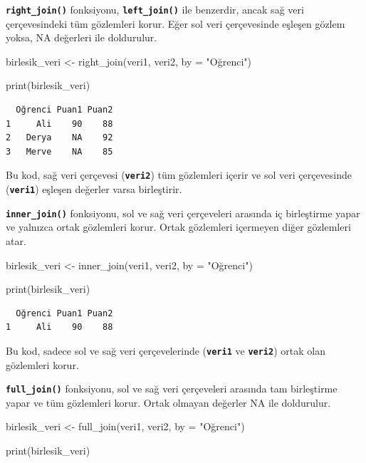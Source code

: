 \documentclass[
  letterpaper,
  DIV=11,
  numbers=noendperiod]{scrreprt}
\newenvironment{Shaded}{\begin{snugshade}}{\end{snugshade}}
\newcommand{\AttributeTok}[1]{\textcolor[rgb]{0.40,0.45,0.13}{#1}}
\newcommand{\FunctionTok}[1]{\textcolor[rgb]{0.28,0.35,0.67}{#1}}
\newcommand{\NormalTok}[1]{\textcolor[rgb]{0.00,0.23,0.31}{#1}}
\newcommand{\OtherTok}[1]{\textcolor[rgb]{0.00,0.23,0.31}{#1}}
\newcommand{\StringTok}[1]{\textcolor[rgb]{0.13,0.47,0.30}{#1}}
\begin{document}
\textbf{\texttt{right\_join()}} fonksiyonu,
\textbf{\texttt{left\_join()}} ile benzerdir, ancak sağ veri
çerçevesindeki tüm gözlemleri korur. Eğer sol veri çerçevesinde eşleşen
gözlem yoksa, NA değerleri ile doldurulur.

\begin{Shaded}
\begin{Highlighting}[]
\NormalTok{birlesik\_veri }\OtherTok{\textless{}{-}} \FunctionTok{right\_join}\NormalTok{(veri1, veri2, }\AttributeTok{by =} \StringTok{"Oğrenci"}\NormalTok{)}

\FunctionTok{print}\NormalTok{(birlesik\_veri)}
\end{Highlighting}
\end{Shaded}

\begin{verbatim}
  Oğrenci Puan1 Puan2
1     Ali    90    88
2   Derya    NA    92
3   Merve    NA    85
\end{verbatim}

Bu kod, sağ veri çerçevesi (\textbf{\texttt{veri2}}) tüm gözlemleri
içerir ve sol veri çerçevesinde (\textbf{\texttt{veri1}}) eşleşen
değerler varsa birleştirir.

\textbf{\texttt{inner\_join()}} fonksiyonu, sol ve sağ veri çerçeveleri
arasında iç birleştirme yapar ve yalnızca ortak gözlemleri korur. Ortak
gözlemleri içermeyen diğer gözlemleri atar.

\begin{Shaded}
\begin{Highlighting}[]
\NormalTok{birlesik\_veri }\OtherTok{\textless{}{-}} \FunctionTok{inner\_join}\NormalTok{(veri1, veri2, }\AttributeTok{by =} \StringTok{"Oğrenci"}\NormalTok{)}

\FunctionTok{print}\NormalTok{(birlesik\_veri)}
\end{Highlighting}
\end{Shaded}

\begin{verbatim}
  Oğrenci Puan1 Puan2
1     Ali    90    88
\end{verbatim}

Bu kod, sadece sol ve sağ veri çerçevelerinde (\textbf{\texttt{veri1}}
ve \textbf{\texttt{veri2}}) ortak olan gözlemleri korur.

\textbf{\texttt{full\_join()}} fonksiyonu, sol ve sağ veri çerçeveleri
arasında tam birleştirme yapar ve tüm gözlemleri korur. Ortak olmayan
değerler NA ile doldurulur.

\begin{Shaded}
\begin{Highlighting}[]
\NormalTok{birlesik\_veri }\OtherTok{\textless{}{-}} \FunctionTok{full\_join}\NormalTok{(veri1, veri2, }\AttributeTok{by =} \StringTok{"Oğrenci"}\NormalTok{)}

\FunctionTok{print}\NormalTok{(birlesik\_veri)}
\end{Highlighting}
\end{Shaded}
\end{document}
